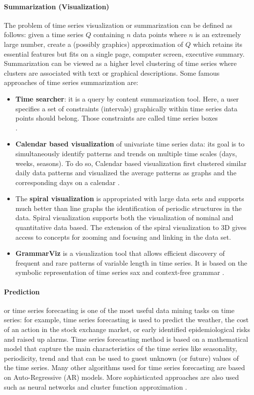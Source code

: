 \paragraph{Summarization (Visualization)}
The problem of time series visualization or summarization can be defined as follows: given a time series $Q$ containing $n$ data points where $n$ is an extremely large number, create a (possibly graphics) approximation of $Q$ which retains its essential features but fits on a single page, computer screen, executive summary. Summarization can be viewed as a higher level clustering of time series  where clusters are associated with text or graphical descriptions. Some famous approaches of time series summarization  are:
\begin{itemize}

\item    \textbf{Time searcher}: it is a query by content summarization tool. Here, a user specifies a set of constraints (intervals) graphically within time series data points should belong. Those constraints are called time series boxes \\ \cite{hochheiser2003interactive}.
\item    \textbf{Calendar based visualization} of univariate time series data: its goal is to simultaneously identify patterns and trends on multiple time scales (days, weeks, seasons). To do so, Calendar based visualization first clustered similar daily data patterns and visualized the average patterns as graphs and the corresponding days on a calendar \cite{van1999cluster}. 
\item    The \textbf{spiral visualization} is appropriated with large data sets and supports much better than line graphs the identification of periodic structures in the data. Spiral visualization supports both the visualization of nominal and quantitative data based. The extension of the spiral visualization to 3D gives access to concepts for zooming and focusing and linking in the data set\cite{weber2001visualizing}. 
\item    \textbf{GrammarViz} is a visualization tool that allows efficient discovery of frequent and rare patterns  of variable length in time series. It is based on the symbolic representation of time series sax and context-free grammar \cite{senin2014grammarviz}.
\end{itemize} 

\paragraph{Prediction} or time series forecasting is one of the most useful data mining tasks on time series: for example, time series forecasting is used to predict the weather, the cost of an action in the stock exchange market, or early identified epidemiological risks and raised up alarms. Time series forecasting method is based on a mathematical model that capture the main characteristics of the time series like seasonality, periodicity, trend and that can be used to guest unknown (or future) values of the time series. Many other algorithms used for time series forecasting are based on Auto-Regressive (AR) models. More sophisticated approaches are also used such as neural networks and cluster function approximation \cite{mahalakshmi2016survey}.
